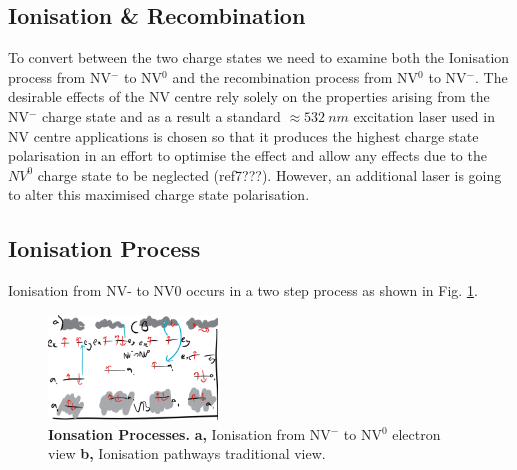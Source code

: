 \documentclass[prl]{revtex4}
\begin{document}

\subsection{Ionisation \& Recombination}
To convert between the two charge states we need to examine both the Ionisation process from NV$^-$ to NV$^0$ and the recombination process from NV$^0$ to NV$^-$. The desirable effects of the NV centre rely solely on the properties arising from the NV$^-$ charge state and as a result a standard $\approx \SI{532}{nm}$ excitation laser used in NV centre applications is chosen so that it produces the highest charge state polarisation in an effort to optimise the effect and allow any effects due to the $NV^0$ charge state to be neglected (ref7???). However, an additional laser is going to alter this maximised charge state polarisation. 

\subsection{Ionisation Process}
Ionisation from NV- to NV0 occurs in a two step process as shown in Fig. \ref{FigChargeConversiona}.

\begin{figure}[H]
  \centering
  \includegraphics[width=0.4\textwidth]{ChargeConversiona.png} 
 \caption{\textbf{Ionsation Processes.} \textbf{a,} Ionisation from NV$^-$ to NV$^0$ electron view \textbf{b,} Ionisation pathways traditional view.} \label{FigChargeConversiona}
\end{figure}
\end{document}
